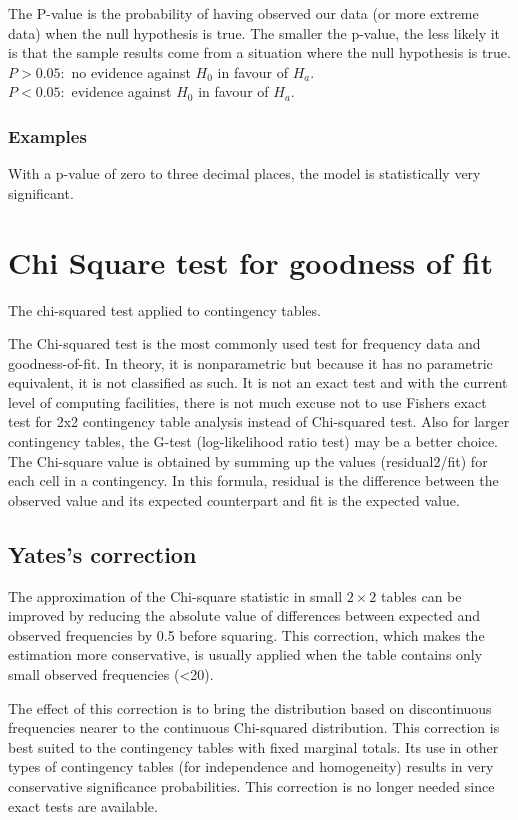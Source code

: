 \documentclass[12pt, a4paper]{report}
\begin{document}
The P-value is the probability of having observed our data (or more extreme data) when the null hypothesis is true.
The smaller the p-value, the less likely it is that the sample results come from a situation where the null hypothesis is true.\\

$P  >  0.05   :$   no evidence against $H_0$ in favour of $H_a$.\\
$P  <  0.05   :$   evidence against $H_0$ in favour of $H_a$.\\

\subsubsection{Examples}
With a p-value of zero to three decimal places, the model is statistically very significant.


\section{Chi Square test for goodness of fit}
The chi-squared test applied to contingency tables.

The Chi-squared test is the most commonly used test for frequency data and goodness-of-fit. In theory, it is nonparametric but because it has no parametric equivalent, it is not classified as such. It is not an exact test and with the current level of computing facilities, there is not much excuse not to use Fishers exact test for 2x2 contingency table analysis instead of Chi-squared test. Also for larger contingency tables, the G-test (log-likelihood ratio test) may be a better choice. The Chi-square value is obtained by summing up the values (residual2/fit) for each cell in a contingency. In this formula, residual is the difference between the observed value and its expected counterpart and fit is the expected value.

\subsection{Yates's correction}

The approximation of the Chi-square statistic in small $2\times2$ tables can be improved by reducing the absolute value of differences between expected and observed frequencies by 0.5 before squaring. This correction, which makes the estimation more conservative, is usually applied when the table contains only small observed frequencies (<20).

The effect of this correction is to bring the distribution based on discontinuous frequencies nearer to the continuous Chi-squared distribution. This correction is best suited to the contingency tables with fixed marginal totals. Its use in other types of contingency tables (for independence and homogeneity) results in very conservative significance probabilities. This correction is no longer needed since exact tests are available.
\end{document}
